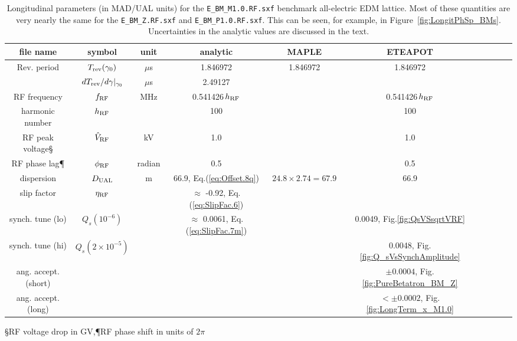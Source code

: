 \documentclass[]{article}
\begin{document}
%
%
\begin{table}[h]
\caption{\label{tbl:benchmarkParamsLongit}Longitudinal parameters (in MAD/UAL units) 
for the {\tt E\_BM\_M1.0.RF.sxf} benchmark all-electric EDM lattice.  
Most of these quantities are very nearly the same for the 
{\tt E\_BM\_Z.RF.sxf} and {\tt E\_BM\_P1.0.RF.sxf}.
This can be seen, for example, in Figure~\ref{fig:LongitPhSp_BMs}.
Uncertainties in the analytic values are discussed in the text.
} 
\medskip
\centering
\begin{tabular}{|c|c|c|c|c|c|c|c|c|c|}           \hline
file name         & symbol                & unit               &         analytic                   &   MAPLE               & ETEAPOT \\ 
\hline
Rev. period       & $T_{\rm rev}(\gamma_0)$ & $\mu$s             &        1.846972                    & 1.846972              & 1.846972  \\      
                  & $dT_{\rm rev}/d\gamma|_{\gamma_0}$  & $\mu$s  &       2.49127                      &                       &            \\
RF frequency      & $f_{\rm RF}$            & MHz               &        0.541426\,$h_{\rm RF}$       &              & 0.541426\,$h_{\rm RF}$ \\  
harmonic number   &  $h_{\rm RF}$           &                   &      100                           &                       &     100      \\
RF peak voltage\S &  $\hat V_{\rm RF}$      & kV                &      1.0                           &                       &     1.0    \\
RF phase lag\P    &  $\phi_{\rm RF}$        & radian            &      0.5                           &                       &    0.5    \\ \hline\hline
dispersion        &  $D_{\rm UAL}$          &   m               & 66.9, Eq.(\ref{eq:Offset.8q})      & $24.8\times2.74=67.9$ &  66.9       \\
slip factor       & $\eta_{\rm RF}$         &                   & $\approx$ -0.92, Eq.(\ref{eq:SlipFac.6})    &                       &                                \\
synch. tune (lo)  & $Q_s(10^{-6})$         &                    & $\approx$ 0.0061, Eq.(\ref{eq:SlipFac.7m})  &                       & 0.0049, Fig.\ref{fig:QsVSsqrtVRF} \\
synch. tune (hi)  & $Q_s(2\times10^{-5})$  &                    &                                    &                      & 0.0048, Fig.\ref{fig:Q_sVsSynchAmplitude}  \\ 
\hline
ang. accept. (short) &                    &                    &                                    &                      & $\pm0.0004$, Fig.\ref{fig:PureBetatron_BM_Z}  \\
ang. accept. (long)  &                    &                    &                                    &                      & $<\pm0.0002$, Fig.\ref{fig:LongTerm_x_M1.0}  \\
\hline
\end{tabular}
\medskip
\qquad \S RF voltage drop in GV,\quad\P RF phase shift in units of $2\pi$
\end{table}
\end{document}
